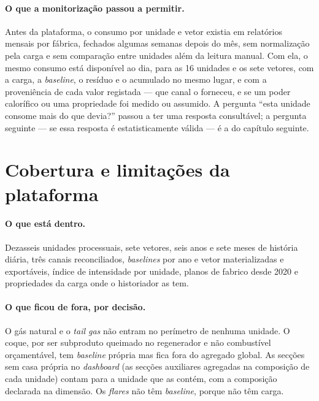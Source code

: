 \paragraph{O que a monitorização passou a permitir.} Antes da plataforma,
o consumo por unidade e vetor existia em relatórios mensais por fábrica,
fechados algumas semanas depois do mês, sem normalização pela carga e sem
comparação entre unidades além da leitura manual. Com ela, o mesmo consumo
está disponível ao dia, para as 16 unidades e os sete vetores, com a
carga, a \emph{baseline}, o resíduo e o acumulado no mesmo lugar, e com a
proveniência de cada valor registada --- que canal o forneceu, e se um
poder calorífico ou uma propriedade foi medido ou assumido. A pergunta
``esta unidade consome mais do que devia?'' passou a ter uma resposta
consultável; a pergunta seguinte --- se essa resposta é estatisticamente
válida --- é a do capítulo seguinte.

\section{Cobertura e limitações da plataforma}
\label{sec:cobertura}

\paragraph{O que está dentro.} Dezasseis unidades processuais, sete
vetores, seis anos e sete meses de história diária, três canais
reconciliados, \emph{baselines} por ano e vetor materializadas e
exportáveis, índice de intensidade por unidade, planos de fabrico desde
2020 e propriedades da carga onde o historiador as tem.

\paragraph{O que ficou de fora, por decisão.} O gás natural e o
\emph{tail gas} não entram no perímetro de nenhuma unidade. O coque, por
ser subproduto queimado no regenerador e não combustível orçamentável,
tem \emph{baseline} própria mas fica fora do agregado global. As secções
sem casa própria no \emph{dashboard} (as secções auxiliares agregadas na
composição de cada unidade) contam para a unidade que as contém, com a
composição declarada na dimensão. Os \emph{flares} não têm
\emph{baseline}, porque não têm carga.

